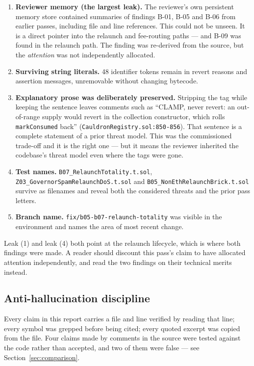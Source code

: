 \documentclass[11pt,a4paper]{article}
\newcommand{\code}[1]{\texttt{\small #1}}
\newcommand{\fileref}[1]{\texttt{\scriptsize #1}}
\begin{document}
\begin{enumerate}
\item \textbf{Reviewer memory (the largest leak).} The reviewer's own persistent memory
      store contained summaries of findings B-01, B-05 and B-06 from earlier passes,
      including file and line references. This could not be unseen. It is a direct pointer
      into the relaunch and fee-routing paths --- and B-09 was found in the relaunch path.
      The finding was re-derived from the source, but the \emph{attention} was not
      independently allocated.
\item \textbf{Surviving string literals.} 48 identifier tokens remain in revert reasons and
      assertion messages, unremovable without changing bytecode.
\item \textbf{Explanatory prose was deliberately preserved.} Stripping the tag while
      keeping the sentence leaves comments such as ``CLAMP, never revert: an out-of-range
      supply would revert in the collection constructor, which rolls \code{markConsumed}
      back'' (\fileref{CauldronRegistry.sol:850-856}). That sentence is a complete
      statement of a prior threat model. This was the commissioned trade-off and it is the
      right one --- but it means the reviewer inherited the codebase's threat model even
      where the tags were gone.
\item \textbf{Test names.} \code{B07\_RelaunchTotality.t.sol},
      \code{Z03\_GovernorSpamRelaunchDoS.t.sol} and
      \code{B05\_NonEthRelaunchBrick.t.sol} survive as filenames and reveal both the
      considered threats and the prior pass letters.
\item \textbf{Branch name.} \code{fix/b05-b07-relaunch-totality} was visible in the
      environment and names the area of most recent change.
\end{enumerate}

\noindent Leak (1) and leak (4) both point at the relaunch lifecycle, which is where both
findings were made. A reader should discount this pass's claim to have allocated attention
independently, and read the two findings on their technical merits instead.

\subsection{Anti-hallucination discipline}

Every claim in this report carries a file and line verified by reading that line; every
symbol was grepped before being cited; every quoted excerpt was copied from the file. Four
claims made by comments in the source were tested against the code rather than accepted,
and two of them were false --- see Section~\ref{sec:comparison}.
\end{document}
